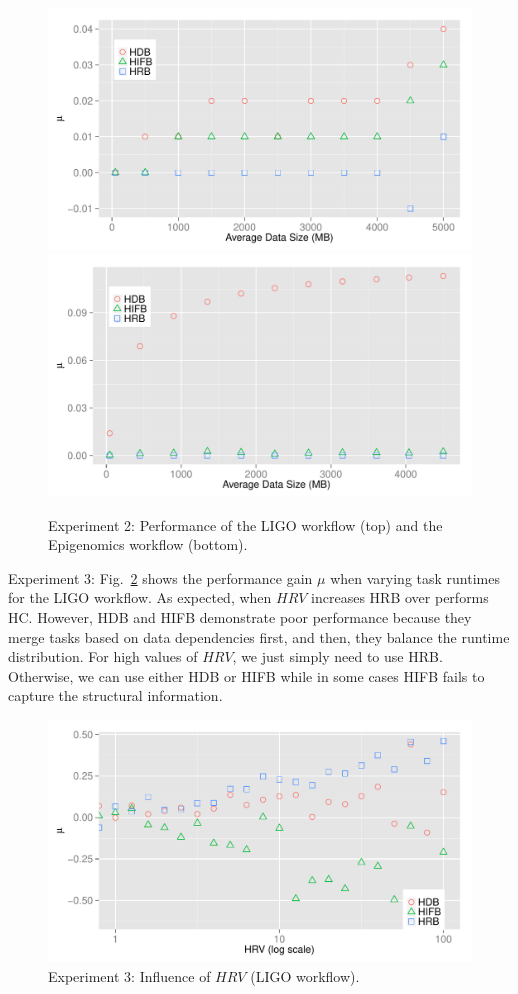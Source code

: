 \begin{figure}[htb]
	\centering
	\includegraphics[width=\linewidth]{figure/exp2_ligo.pdf}
	\includegraphics[width=\linewidth]{figure/exp2_genome.pdf}
	\caption{Experiment 2: Performance of the LIGO workflow (top) and the Epigenomics workflow (bottom).}
	\label{fig:performance}
	\vspace{-10pt}
\end{figure}

Experiment 3: Fig.~\ref{fig:incluence_of_hrv} shows the performance gain $\mu$ when varying task runtimes for the LIGO workflow. As expected, when $HRV$ increases HRB over performs HC. However, HDB and HIFB demonstrate poor performance because they merge tasks based on data dependencies first, and then, they balance the runtime distribution. 
For high values of $HRV$, we just simply need to use HRB. Otherwise, we can use either HDB or HIFB while in some cases HIFB fails to capture the structural information. 

\begin{figure}[htb]
\centering
	\includegraphics[width=\linewidth]{figure/exp3.pdf}
	\caption{Experiment 3: Influence of $HRV$ (LIGO workflow).}
	\label{fig:incluence_of_hrv}
	\vspace{-10pt}
\end{figure}




